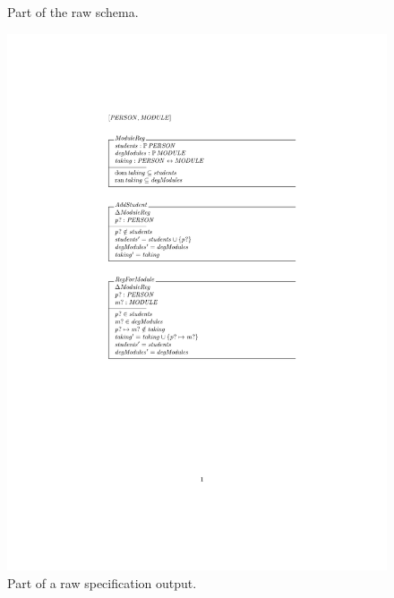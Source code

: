 \begin{figure}[H]
\begin{minipage}{0.45\textwidth}
\begin{tiny}
\begin{BVerbatim}
\end{BVerbatim}
\end{tiny}
\vspace{-0.18in}
\caption{Part of the raw schema.\label{fig:rawschema}}
\vspace{-0.2in}
\end{minipage}\hfill
\begin{minipage}{0.45\textwidth}
\centering
\includegraphics[clip, trim=5cm 11.5cm 10cm 5.5cm, width=1.00\textwidth]{examples/modulereg/0.pdf}
\vspace{-0.2in}
\caption{Part of a raw specification output. \label{fig:rawschemaout}}
\vspace{-0.2in}
\end{minipage}
\end{figure}


